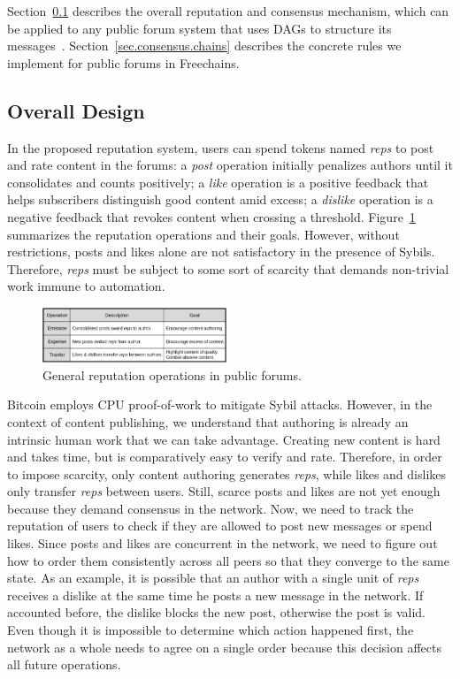 \documentclass[10pt,journal,compsoc]{IEEEtran}
\newcommand{\FC}       {Freechains\xspace}
\newcommand{\reps}     {\emph{reps}\xspace}
\begin{document}
Section~\ref{sec.consensus.design} describes the overall reputation and
consensus mechanism, which can be applied to any public forum system that uses
DAGs to structure its messages~\cite{33,34,p2p.merkle-crdts}.
Section~\ref{sec.consensus.chains} describes the concrete rules we implement
for public forums in \FC.

\subsection{Overall Design}
\label{sec.consensus.design}

In the proposed reputation system, users can spend tokens named \reps to post
and rate content in the forums:
a \emph{post} operation initially penalizes authors until it consolidates and
counts positively;
a \emph{like} operation is a positive feedback that helps subscribers
distinguish good content amid excess;
a \emph{dislike} operation is a negative feedback that revokes content when
crossing a threshold.
Figure~\ref{fig.general} summarizes the reputation operations and their goals.
%
However, without restrictions, posts and likes alone are not satisfactory in
the presence of Sybils.
Therefore, \reps must be subject to some sort of scarcity that demands
non-trivial work immune to automation.

\begin{figure}
\centering
\includegraphics[width=0.49\textwidth]{general.png}
\caption{General reputation operations in public forums.}
\label{fig.general}
\end{figure}

Bitcoin employs CPU proof-of-work to mitigate Sybil attacks.
However, in the context of content publishing, we understand that authoring is
already an intrinsic human work that we can take advantage.
Creating new content is hard and takes time, but is comparatively easy to
verify and rate.
Therefore, in order to impose scarcity, only content authoring generates \reps,
while likes and dislikes only transfer \reps between users.
%
Still, scarce posts and likes are not yet enough because they demand consensus
in the network.
Now, we need to track the reputation of users to check if they are allowed to
post new messages or spend likes.
Since posts and likes are concurrent in the network, we need to figure out how
to order them consistently across all peers so that they converge to the same
state.
As an example, it is possible that an author with a single unit of \reps
receives a dislike at the same time he posts a new message in the network.
If accounted before, the dislike blocks the new post, otherwise the post is
valid.
Even though it is impossible to determine which action happened first, the
network as a whole needs to agree on a single order because this decision
affects all future operations.
\end{document}
